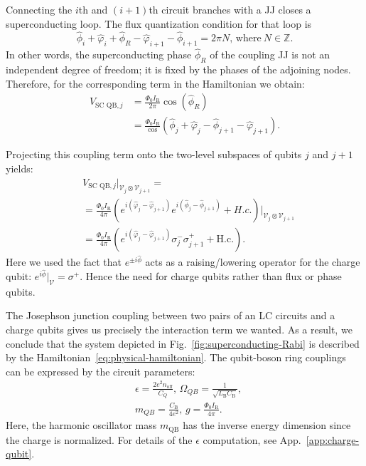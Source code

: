 \documentclass[reprint, aps, prx, amsmath, amssymb, longbibliography, superscriptaddress]{revtex4-2}
\begin{document}
Connecting the $i$th and $(i+1)$th circuit branches with a JJ closes a superconducting loop. The flux quantization condition for that loop is
\begin{equation}
  \hat \phi_i + \hat\varphi_i + \hat\phi_R - \hat\varphi_{i+1} - \hat\phi_{i+1} = 2\pi N, \, \text{where}\ N \in \mathbb{Z}.
\end{equation} 
In other words, the superconducting phase $\hat \phi_R$ of the coupling JJ is not an independent degree of freedom; it is fixed by the phases of the adjoining nodes. Therefore, for the corresponding term in the Hamiltonian we obtain:
\begin{equation}
\begin{aligned}
    V_{\text{SC QB},j} &= \frac{\Phi_0 I_{\text{R}}}{2\pi}\cos(\hat \phi_R) \\
    &= \frac{\Phi_0 I_{\text{R}}}\cos(\hat \phi_j + \hat \varphi_j - \hat \phi_{j+1} - \hat \varphi_{j+1}).
\end{aligned}
\end{equation}

Projecting this coupling term onto the two-level subspaces of qubits $j$ and $j+1$ yields:
\begin{equation}
\begin{aligned}
    &V_{\text{SC QB},j} \bigg |_{\mathcal{V}_j\otimes \mathcal{V}_{j+1}} = \\
    &=\frac{\Phi_0 I_{\text{R}}}{4\pi}\left(e^{i(\hat\varphi_j - \hat\varphi_{j+1})} e^{i(\hat\phi_j - \hat\phi_{j+1})} + H.c. \right) \bigg|_{\mathcal{V}_j\otimes \mathcal{V}_{j+1}} \\
    &=\frac{\Phi_0 I_{\text{R}}}{4\pi}\left(e^{i(\hat\varphi_j - \hat\varphi_{j+1})} \sigma_j^- \sigma_{j+1}^+ + \mathrm{H.c.} \right).
\end{aligned}
\end{equation}
Here we used the fact that $e^{\pm i\hat\phi}$ acts as a raising/lowering operator for the charge qubit: $e^{i\hat\phi}|_{\mathcal{V}} = \sigma^+$. Hence the need for charge qubits rather than flux or phase qubits.

The Josephson junction coupling between two pairs of an LC circuits and a charge qubits gives us precisely the interaction term we wanted. As a result, we conclude that the system depicted in Fig.~\ref{fig:superconducting-Rabi} is described by the Hamiltonian~\eqref{eq:physical-hamiltonian}.  The qubit-boson ring couplings can be expressed by the circuit parameters:
\begin{equation}
\begin{aligned}
    &\epsilon = \frac{2e^2n_{\mathrm{off}}}{C_Q},\,
    \Omega_{QB} = \frac{1}{\sqrt{L_{\text{B}}C_{\text{B}}}}, \\
    &m_{QB} = \frac{C_{\text{B}}}{4e^2}, \, g = \frac{\Phi_0 I_{\text{R}}}{4\pi}.
\end{aligned}
\end{equation}
Here, the harmonic oscillator mass $m_{\text{QB}}$ has the inverse energy dimension since the charge is normalized. For details of the $\epsilon$ computation, see App.~\ref{app:charge-qubit}. 
\end{document}
